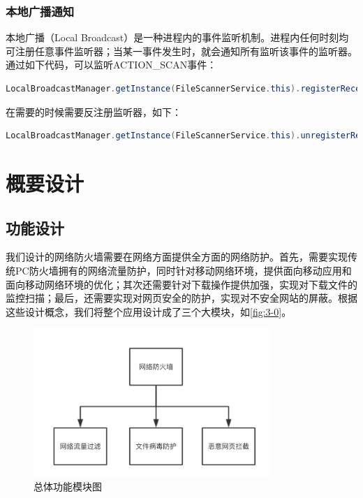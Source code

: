 \documentclass[format=final, language=chinese, degree=fyp]{hustthesis}
\begin{document}
\subsection{本地广播通知}

本地广播（Local Broadcast）是一种进程内的事件监听机制。进程内任何时刻均可注册任意事件监听器；当某一事件发生时，就会通知所有监听该事件的监听器。通过如下代码，可以监听ACTION\_SCAN事件：


\begin{lstlisting}[language=java]
LocalBroadcastManager.getInstance(FileScannerService.this).registerReceiver(mReceiver, new IntentFilter(DownloadFileObserver.ACTION_SCAN));
\end{lstlisting}
 

在需要的时候需要反注册监听器，如下：
\begin{lstlisting}[language=java]
LocalBroadcastManager.getInstance(FileScannerService.this).unregisterReceiver(mReceiver);
\end{lstlisting}

\chapter{概要设计}

\section{功能设计}

我们设计的网络防火墙需要在网络方面提供全方面的网络防护。首先，需要实现传统PC防火墙拥有的网络流量防护，同时针对移动网络环境，提供面向移动应用和面向移动网络环境的优化；其次还需要针对下载操作提供加强，实现对下载文件的监控扫描；最后，还需要实现对网页安全的防护，实现对不安全网站的屏蔽。根据这些设计概念，我们将整个应用设计成了三个大模块，如\autoref{fig:3-0}。

\begin{figure}[!h]
\centering
\includegraphics[width=0.8\textwidth]{function_all.png}
\caption{总体功能模块图}\label{fig:3-0}
\end{figure}
\end{document}
